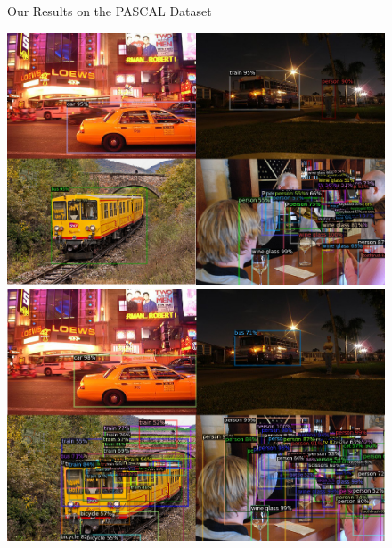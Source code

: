 \documentclass{article}
\begin{document}
\begin{figure}[h]
\begin{minipage}{0.47\textwidth}
  \end{minipage}
  \caption{Our Results on the PASCAL Dataset }
  \label{finetuning}
\end{figure}


\begin{figure}[h]
  \begin{minipage}{0.47\textwidth}
  \includegraphics[width=\textwidth, height=0.17\textheight]{./../../figures/1shot.png}
  \end{minipage}
  \begin{minipage}{0.47\textwidth}
  \includegraphics[width=\textwidth, height=0.17\textheight]{./../../figures/5shot.png}
  \end{minipage}
  \begin{minipage}{0.47\textwidth}

\end{minipage}
\end{figure}
\end{document}
